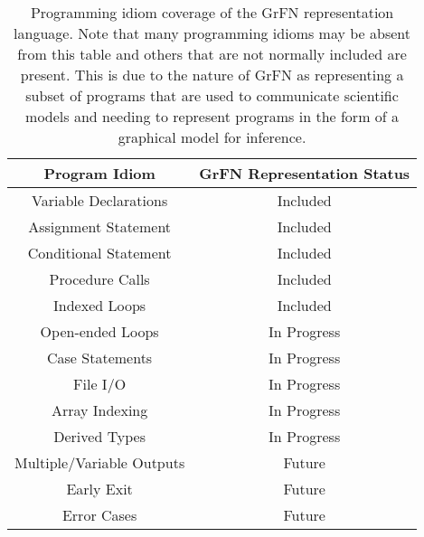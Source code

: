 \begin{table}
  \centering
  \label{tab:prog_idioms}
  \begin{tabular}{ |c|c| }
   \hline
   \textbf{Program Idiom} & \textbf{GrFN Representation Status} \\
   \hline
   Variable Declarations & Included \\
   Assignment Statement & Included \\
   Conditional Statement & Included \\
   Procedure Calls & Included \\
   Indexed Loops & Included \\
   Open-ended Loops & In Progress \\
   Case Statements & In Progress \\
   File I/O & In Progress \\
   Array Indexing & In Progress \\
   Derived Types & In Progress \\
   Multiple/Variable Outputs & Future \\
   Early Exit & Future \\
   Error Cases & Future \\
   \hline
  \end{tabular}
  \caption[GrFN Program Idiom Coverage]{Programming idiom coverage of the GrFN representation language. Note that many programming idioms may be absent from this table and others that are not normally included are present. This is due to the nature of GrFN as representing a subset of programs that are used to communicate scientific models and needing to represent programs in the form of a graphical model for inference.}
\end{table}

